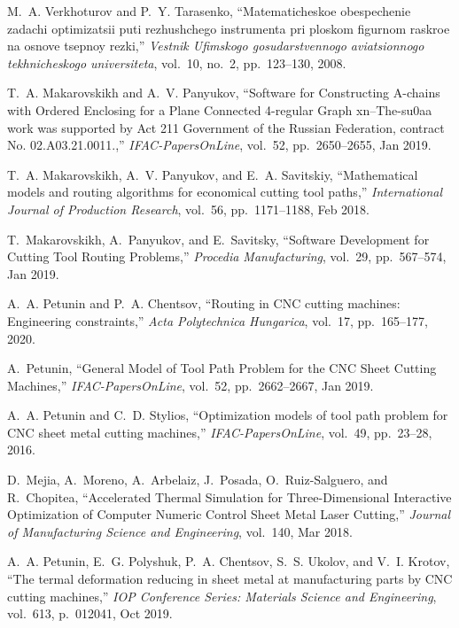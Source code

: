 \begin{thebibliography}{10}
M.~A. Verkhoturov and P.~Y. Tarasenko, ``Matematicheskoe obespechenie zadachi
  optimizatsii puti rezhushchego instrumenta pri ploskom figurnom raskroe na
  osnove tsepnoy rezki,'' {\em Vestnik Ufimskogo gosudarstvennogo aviatsionnogo
  tekhnicheskogo universiteta}, vol.~10, no.~2, pp.~123--130, 2008.

T.~A. Makarovskikh and A.~V. Panyukov, ``{Software for Constructing A-chains
  with Ordered Enclosing for a Plane Connected 4-regular Graph xn--The-su0aa
  work was supported by Act 211 Government of the Russian Federation, contract
  No. 02.A03.21.0011.},'' {\em IFAC-PapersOnLine}, vol.~52, pp.~2650--2655, Jan
  2019.

T.~A. Makarovskikh, A.~V. Panyukov, and E.~A. Savitskiy, ``{Mathematical models
  and routing algorithms for economical cutting tool paths},'' {\em
  International Journal of Production Research}, vol.~56, pp.~1171--1188, Feb
  2018.

T.~Makarovskikh, A.~Panyukov, and E.~Savitsky, ``{Software Development for
  Cutting Tool Routing Problems},'' {\em Procedia Manufacturing}, vol.~29,
  pp.~567--574, Jan 2019.

A.~A. Petunin and P.~A. Chentsov, ``Routing in {CNC} cutting machines:
  Engineering constraints,'' {\em Acta Polytechnica Hungarica}, vol.~17,
  pp.~165--177, 2020.

A.~Petunin, ``{General Model of Tool Path Problem for the {CNC} Sheet Cutting
  Machines},'' {\em IFAC-PapersOnLine}, vol.~52, pp.~2662--2667, Jan 2019.

A.~A. Petunin and C.~D. Stylios, ``Optimization models of tool path problem for
  {CNC} sheet metal cutting machines,'' {\em IFAC-PapersOnLine}, vol.~49,
  pp.~23--28, 2016.

D.~Mejia, A.~Moreno, A.~Arbelaiz, J.~Posada, O.~Ruiz-Salguero, and R.~Chopitea,
  ``{Accelerated Thermal Simulation for Three-Dimensional Interactive
  Optimization of Computer Numeric Control Sheet Metal Laser Cutting},'' {\em
  Journal of Manufacturing Science and Engineering}, vol.~140, Mar 2018.

A.~A. Petunin, E.~G. Polyshuk, P.~A. Chentsov, S.~S. Ukolov, and V.~I. Krotov,
  ``{The termal deformation reducing in sheet metal at manufacturing parts by
  {CNC} cutting machines},'' {\em IOP Conference Series: Materials Science and
  Engineering}, vol.~613, p.~012041, Oct 2019.


\end{thebibliography}
